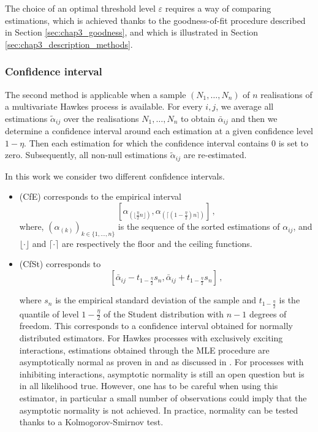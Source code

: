    The choice of an optimal threshold level $\varepsilon$ requires a way of comparing estimations, which is achieved thanks to the goodness-of-fit procedure described in Section \ref{sec:chap3_goodness},
   and which is illustrated in Section \ref{sec:chap3_description_methods}.
   
   \subsubsection{Confidence interval}\label{sec:chap3_confidence_interval}
   
   The second method is applicable when a sample $(N_1, \ldots, N_n)$ of $n$ realisations of a multivariate Hawkes process is available. For every $i,j$, we average all estimations $\tilde\alpha_{ij}$ over the realisations $N_1, \ldots, N_n$ to obtain $\bar\alpha_{ij}$ and then we determine a confidence interval around each estimation at a given confidence level $1-\eta$. Then each estimation for which the confidence interval contains $0$ is set to zero. Subsequently, all non-null estimations $\tilde\alpha_{ij}$ are re-estimated.
   
   In this work we consider two different confidence intervals. 
   \begin{itemize}
   \item (CfE) corresponds to the empirical interval
   \[
      \left[\alpha_{(\lfloor{\frac{\eta}{2} n}\rfloor)}, \alpha_{(\lceil (1-\frac{\eta}{2}) n \rceil)}\right]\,,
    \]
    where, $(\alpha_{(k)})_{k\in \{1, \ldots, n\}}$ is the sequence of the sorted estimations of $\alpha_{ij}$,
    and $\lfloor \cdot \rfloor$ and $\lceil \cdot \rceil$ are respectively the floor and the ceiling functions.
   \item (CfSt) corresponds to
   \[\left[\bar\alpha_{ij} - t_{1-\frac{\eta}{2}} s_n, \bar\alpha_{ij} + t_{1-\frac{\eta}{2}} s_n \right]\,,\]

   where $s_n$ is the empirical standard deviation of the sample and $t_{1-\frac{\eta}{2}}$ is the quantile of level $1-\frac{\eta}{2}$ of the Student distribution with $n-1$ degrees of freedom. 
   This corresponds to a confidence interval obtained for normally distributed estimators.
   For Hawkes processes with exclusively exciting interactions, estimations obtained through the MLE procedure are asymptotically normal as proven in \textcite[Theorem 5]{Ogata1978} and as discussed in \textcite{Laub2014}.
   For processes with inhibiting interactions, 
   asymptotic normality is still an open question but is in all likelihood true.
   However, one has to be careful when using this estimator, in particular a small number of observations could imply that the asymptotic normality is not achieved. In practice, normality can be tested thanks to a Kolmogorov-Smirnov test.   
   
   \end{itemize}
   
